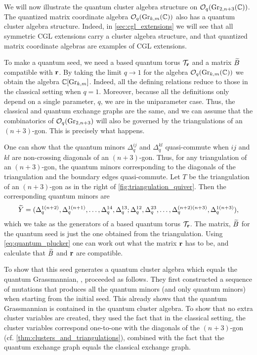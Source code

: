 We will now illustrate the quantum cluster algebra structure on $\mathcal{O}_q(\operatorname{Gr}_{2,
			n+3}(\mathbb{C}))$. The quantized matrix coordinate algebra $\mathcal{O}_q(\operatorname{Gr}_{k, m}(\mathbb{C}))$ also
has a quantum cluster algebra structure. Indeed, in \cref{sec:cgl_extensions} we will
see that all symmetric CGL extensions carry a cluster algebra structure, and that
quantized matrix coordinate algebras are examples of CGL extensions.

\medskip

To make a quantum seed, we need a based quantum torus $\mathcal{T}_{\mathbf{r}}$ and a matrix $\widetilde{B}$
compatible with $\mathbf{r}$. By taking the limit $q\to 1$ for the algebra $\mathcal{O}_q(\operatorname{Gr}_{k,
			m}(\mathbb{C}))$ we obtain the algebra $\mathbb{C}[\operatorname{Gr}_{k,m}]$. Indeed, all the defining relations
reduce to those in the classical setting when $q = 1$. Moreover, because all the
definitions only depend on a single parameter, $q$, we are in the uniparameter case.
Thus, the classical and quantum exchange graphs are the same, and we can assume that
the combinatorics of $\mathcal{O}_q(\operatorname{Gr}_{2, n+3})$ will also be governed by the triangulations
of an $(n+3)$-gon. This is precisely what happens.

One can show that the quantum minors $\Delta_q^{ij}$ and $\Delta_q^{kl}$ quasi-commute
when $ij$ and $kl$ are non-crossing diagonals of an $(n+3)$-gon. Thus, for any
triangulation of an $(n+3)$-gon, the quantum minors corresponding to the diagonals of
the triangulation and the boundary edges quasi-commute. Let $T$ be the triangulation of
an $(n+3)$-gon as in the right of \cref{fig:triangulation_quiver}. Then the
corresponding quantum minors are
\begin{equation*}
	\widetilde{Y} = (\Delta_q^{1(n+2)}, \Delta_q^{1(n+1)}, \dotsc, \Delta_q^{14}, \Delta_q^{13}; \Delta_q^{12}, \Delta_q^{23}, \dotsc, \Delta_q^{(n+2)(n+3)}, \Delta_q^{1(n+3)}),
\end{equation*}
%
which we take as the generators of a based quantum torus $\mathcal{T}_{\mathbf{r}}$. The matrix,
$\widetilde{B}$ for the quantum seed is just the one obtained from the triangulation. Using
\cref{eq:quantum_plucker} one can work out what the matrix $\mathbf{r}$ has to be, and
calculate that $\widetilde{B}$ and $\mathbf{r}$ are compatible.

To show that this seed generates a quantum cluster algebra which equals the quantum
Grassmannian, \textcite{GrabowskiLaunois2011QCAonQuantumGrassmannians}, proceeded as
follows. They first constructed a sequence of mutations that produces all the quantum
minors (and only quantum minors) when starting from the initial seed. This already
shows that the quantum Grassmannian is contained in the quantum cluster algebra. To
show that no extra cluster variables are created, they used the fact that in the
classical setting, the cluster variables correspond one-to-one with the diagonals of
the $(n+3)$-gon (cf. \cref{thm:clusters_and_triangulations}), combined with the fact
that the quantum exchange graph equals the classical exchange graph.

